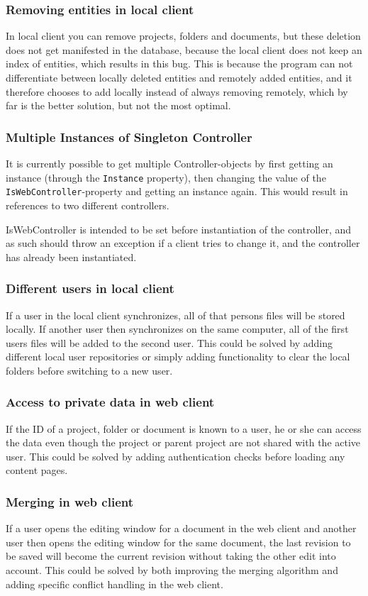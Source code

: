 \subsubsection{Removing entities in local client}
In local client you can remove projects, folders and documents, but these deletion does not get manifested in the database, because the local client does not keep an index of entities, which results in this bug. This is because the program can not differentiate between locally deleted entities and remotely added entities, and it therefore chooses to add locally instead of always removing remotely, which by far is the better solution, but not the most optimal.

\subsubsection{Multiple Instances of Singleton Controller}
It is currently possible to get multiple Controller-objects by first getting an instance (through the \verb|Instance| property),
then changing the value of the \verb|IsWebController|-property and getting an instance again. This would result in references to
two different controllers.

IsWebController is intended to be set before instantiation of the controller, and as such should throw an exception if a client tries
to change it, and the controller has already been instantiated.

\subsubsection{Different users in local client}
If a user in the local client synchronizes, all of that persons files will be stored locally. If another user then synchronizes on the same computer, all of the first users files will be added to the second user. This could be solved by adding different local user repositories or simply adding functionality to clear the local folders before switching to a new user.

\subsubsection{Access to private data in web client}
If the ID of a project, folder or document is known to a user, he or she can access the data even though the project or parent project are not shared with the active user. This could be solved by adding authentication checks before loading any content pages.

\subsubsection{Merging in web client}
If a user opens the editing window for a document in the web client and another user then opens the editing window for the same document, the last revision to be saved will become the current revision without taking the other edit into account. This could be solved by both improving the merging algorithm and adding specific conflict handling in the web client.